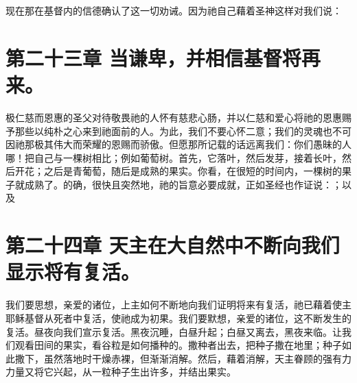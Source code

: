 现在那在基督内的信德确认了这一切劝诫。因为祂自己藉着圣神这样对我们说：\par


\section{第二十三章 当谦卑，并相信基督将再来。}

极仁慈而恩惠的圣父对待敬畏祂的人怀有慈悲心肠，并以仁慈和爱心将祂的恩惠赐予那些以纯朴之心来到祂面前的人。为此，我们不要心怀二意；我们的灵魂也不可因祂那极其伟大而荣耀的恩赐而骄傲。但愿那所记载的话远离我们：你们愚昧的人哪！把自己与一棵树相比；例如葡萄树。首先，它落叶，然后发芽，接着长叶，然后开花；之后是青葡萄，随后是成熟的果实。你看，在很短的时间内，一棵树的果子就成熟了。的确，很快且突然地，祂的旨意必要成就，正如圣经也作证说：；以及\par


\section{第二十四章 天主在大自然中不断向我们显示将有复活。}

我们要思想，亲爱的诸位，上主如何不断地向我们证明将来有复活，祂已藉着使主耶稣基督从死者中复活，使祂成为初果。我们要默想，亲爱的诸位，这不断发生的复活。昼夜向我们宣示复活。黑夜沉睡，白昼升起；白昼又离去，黑夜来临。让我们观看田间的果实，看谷粒是如何播种的。撒种者出去，把种子撒在地里；种子如此撒下，虽然落地时干燥赤裸，但渐渐消解。然后，藉着消解，天主眷顾的强有力力量又将它兴起，从一粒种子生出许多，并结出果实。\par


